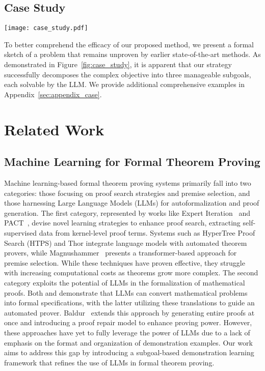 \documentclass{article}
\begin{document}
\subsection{Case Study}

\begin{figure*}[t!]
    \centering
    \texttt{[image: case\_study.pdf]}
    \vspace{-5mm}
    \caption{A formal sketch generated by our proposed method.}
    \label{fig:case_study}
    \vspace{-3mm}
\end{figure*}
To better comprehend the efficacy of our proposed method, we present a formal sketch of a problem that remains unproven by earlier state-of-the-art methods.
As demonstrated in Figure~\ref{fig:case_study}, it is apparent that our strategy successfully decomposes the complex objective into three manageable subgoals, each solvable by the LLM. We provide additional comprehensive examples in Appendix~\ref{sec:appendix_case}.



\section{Related Work} 

\subsection{Machine Learning for Formal Theorem Proving}
Machine learning-based formal theorem proving systems primarily fall into two categories: those focusing on proof search strategies and premise selection, and those harnessing Large Language Models (LLMs) for autoformalization and proof generation. The first category, represented by works like Expert Iteration~\cite{polu2022formal} and PACT~\cite{han2021proof}, devise novel learning strategies to enhance proof search, extracting self-supervised data from kernel-level proof terms. Systems such as HyperTree Proof Search (HTPS)\cite{lample2022hypertree} and Thor\cite{jiang2022thor} integrate language models with automated theorem provers, while Magnushammer~\cite{mikula2023magnushammer} presents a transformer-based approach for premise selection. While these techniques have proven effective, they struggle with increasing computational costs as theorems grow more complex. The second category exploits the potential of LLMs in the formalization of mathematical proofs. Both \citet{wu2022autoformalization} and \citet{jiang2022draft} demonstrate that LLMs can convert mathematical problems into formal specifications, with the latter utilizing these translations to guide an automated prover. Baldur~\cite{first2023baldur} extends this approach by generating entire proofs at once and introducing a proof repair model to enhance proving power. However, these approaches have yet to fully leverage the power of LLMs due to a lack of emphasis on the format and organization of demonstration examples. Our work aims to address this gap by introducing a subgoal-based demonstration learning framework that refines the use of LLMs in formal theorem proving.
\end{document}
